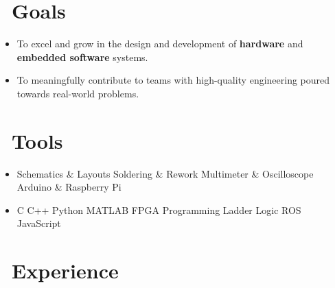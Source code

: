 \documentclass{resume}
\begin{document}



\section{\faTrophy\ Goals}

\begin{itemize}[parsep=0.5ex]

  \item To excel and grow in the design and development of \textbf{hardware} and \textbf{embedded software} systems.
  
  \item To meaningfully contribute to teams with high-quality engineering poured towards real-world problems.
  
\end{itemize}

\section{\faWrench\ Tools}

\begin{itemize}[parsep=0.5ex]
  \item %
  Schematics \& Layouts\textperiodcentered
  Soldering \& Rework\textperiodcentered
  Multimeter \& Oscilloscope\textperiodcentered
  Arduino \& Raspberry Pi
  \hfill \faBolt

  \item %
  C\textperiodcentered 
  C++\textperiodcentered
  Python\textperiodcentered
  MATLAB\textperiodcentered
  FPGA Programming\textperiodcentered
  Ladder Logic\textperiodcentered
  ROS\textperiodcentered
  JavaScript%
  \hfill \faCode

\end{itemize}

\section{\faLineChart\ Experience}
\end{document}
